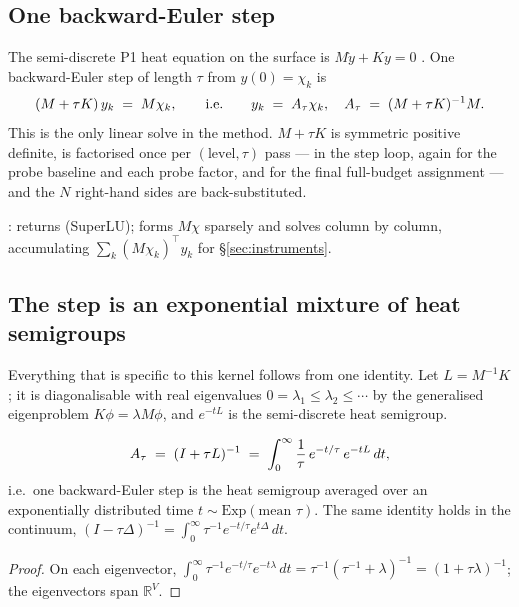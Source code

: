\documentclass[11pt,a4paper]{article}
\begin{document}
\subsection{One backward-Euler step}

The semi-discrete P1 heat equation on the surface is $M \dot y + K y = 0$
\cite{dziuk2013surfacefem}. One backward-Euler step of length $\tau$ from
$y(0) = \chi_k$ is
\begin{equation}
  (M + \tau K)\, y_k \;=\; M \chi_k,
  \qquad\text{i.e.}\qquad
  y_k \;=\; A_\tau \chi_k, \quad A_\tau \;=\; (M + \tau K)^{-1} M .
  \label{eq:be-step}
\end{equation}
This is the only linear solve in the method. $M + \tau K$ is symmetric positive
definite, is factorised once per $(\text{level}, \tau)$ pass --- in the step
loop, again for the probe baseline and each probe factor, and for the final
full-budget assignment --- and the $N$ right-hand sides are back-substituted.

\begin{tcolorbox}[colback=blue!4!white, colframe=blue!40!black,
                  title={Code: the diffusion step}, fontupper=\small]
: 
returns  (SuperLU);
 forms
$M\chi$ sparsely and solves column by column, accumulating
$\sum_k (M\chi_k)^\top y_k$ for \S\ref{sec:instruments}.
\end{tcolorbox}

\subsection{The step is an exponential mixture of heat semigroups}
\label{sec:mixture}

Everything that is specific to this kernel follows from one identity. Let
$L = M^{-1} K$; it is diagonalisable with real eigenvalues
$0 = \lambda_1 \le \lambda_2 \le \cdots$ by the generalised eigenproblem
$K\phi = \lambda M\phi$, and $e^{-tL}$ is the semi-discrete heat semigroup.

\begin{prop}
\label{prop:mixture}
\begin{equation}
  A_\tau \;=\; (I + \tau L)^{-1} \;=\; \int_0^\infty \frac{1}{\tau}\, e^{-t/\tau}\, e^{-tL}\, dt,
  \label{eq:mixture}
\end{equation}
i.e.\ one backward-Euler step is the heat semigroup averaged over an
exponentially distributed time $t \sim \mathrm{Exp}(\text{mean } \tau)$. The same
identity holds in the continuum, $(I - \tau\Delta)^{-1} = \int_0^\infty
\tau^{-1} e^{-t/\tau} e^{t\Delta}\, dt$.
\end{prop}
\begin{proof}
On each eigenvector, $\int_0^\infty \tau^{-1} e^{-t/\tau} e^{-t\lambda}\, dt
= \tau^{-1} (\tau^{-1} + \lambda)^{-1} = (1 + \tau\lambda)^{-1}$; the eigenvectors
span $\mathbb{R}^V$.
\end{proof}
\end{document}
